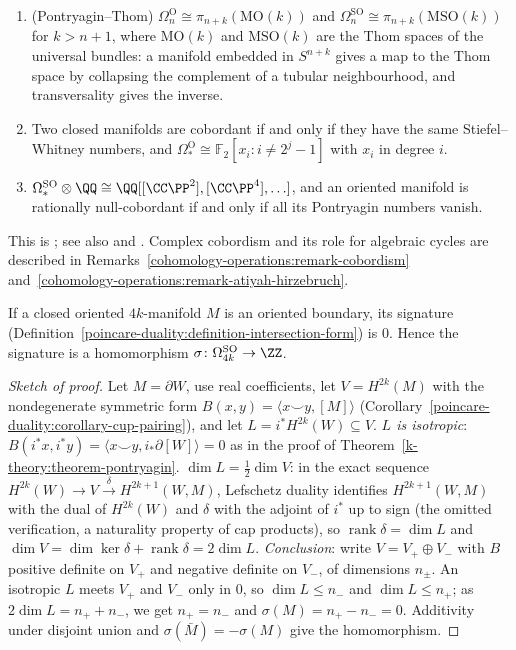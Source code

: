 \begin{theorem}[Thom]\label{k-theory:theorem-thom}
\begin{enumerate}
\item (Pontryagin--Thom) $\Omega^{\mathrm{O}}_n \cong \pi_{n+k}(\mathrm{MO}(k))$ and $\Omega^{\mathrm{SO}}_n \cong \pi_{n+k}(\mathrm{MSO}(k))$ for $k > n + 1$, where $\mathrm{MO}(k)$ and $\mathrm{MSO}(k)$ are the Thom spaces of the
universal bundles: a manifold embedded in $S^{n+k}$ gives a map to the Thom space by collapsing the complement of a tubular neighbourhood, and transversality gives the inverse.
\item Two closed manifolds are cobordant if and only if they have the same Stiefel--Whitney numbers, and $\Omega^{\mathrm{O}}_* \cong \mathbb{F}_2[x_i : i \neq 2^j - 1]$ with $x_i$ in degree $i$.
\item $\Omega^{\mathrm{SO}}_* \otimes \QQ \cong \QQ[[\CC\PP^2], [\CC\PP^4], \ldots]$, and an oriented manifold is rationally null-cobordant if and only if all its Pontryagin numbers vanish.
\end{enumerate}
\end{theorem}

This is \cite{thom-1954}; see also \cite{stong-cobordism} and \cite[Chapters 17--18]{milnor-stasheff}. Complex cobordism and its role for algebraic cycles are described in Remarks~\ref{cohomology-operations:remark-cobordism}
and~\ref{cohomology-operations:remark-atiyah-hirzebruch}.

\begin{proposition}[Thom]\label{k-theory:proposition-signature-cobordism}
If a closed oriented $4k$-manifold $M$ is an oriented boundary, its signature (Definition~\ref{poincare-duality:definition-intersection-form}) is $0$. Hence the signature is a homomorphism
$\sigma \colon \Omega^{\mathrm{SO}}_{4k} \to \ZZ$.
\end{proposition}

\begin{proof}[Sketch of proof]
Let $M = \partial W$, use real coefficients, let $V = H^{2k}(M)$ with the nondegenerate symmetric form $B(x, y) = \langle x \smile y, [M]\rangle$ (Corollary~\ref{poincare-duality:corollary-cup-pairing}), and let
$L = i^*H^{2k}(W) \subseteq V$. \emph{$L$ is isotropic}: $B(i^*x, i^*y) = \langle x \smile y, i_*\partial[W]\rangle = 0$ as in the proof of Theorem~\ref{k-theory:theorem-pontryagin}. \emph{$\dim L = \frac12\dim V$}: in the exact
sequence $H^{2k}(W) \to V \xrightarrow{\delta} H^{2k+1}(W, M)$, Lefschetz duality identifies $H^{2k+1}(W, M)$ with the dual of $H^{2k}(W)$ and $\delta$ with the adjoint of $i^*$ up to sign (the omitted verification, a
naturality property of cap products), so $\operatorname{rank}\delta = \dim L$ and $\dim V = \dim\ker\delta + \operatorname{rank}\delta = 2\dim L$. \emph{Conclusion}: write $V = V_+ \oplus V_-$ with $B$ positive definite on $V_+$ and negative definite on $V_-$, of dimensions $n_\pm$. An isotropic $L$ meets $V_+$ and $V_-$ only in $0$, so $\dim L \leq n_-$ and
$\dim L \leq n_+$; as $2\dim L = n_+ + n_-$, we get $n_+ = n_-$ and $\sigma(M) = n_+ - n_- = 0$. Additivity under disjoint union and
$\sigma(\bar{M}) = -\sigma(M)$ give the homomorphism.
\end{proof}

